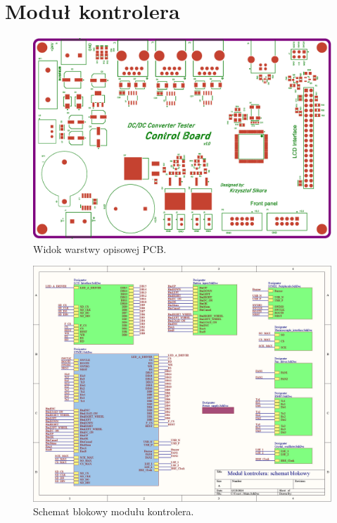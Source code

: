 \appendix

\chapter{Moduł kontrolera}
\begingroup
\renewcommand{\cleardoublepage}{}
\renewcommand{\clearpage}{}
\begin{figure}[h!]
    \begin{center}
        \includegraphics[width = 17cm]{zalaczniki/kontroler/Kontroler_Strona_15.jpg}
        \caption{Widok warstwy opisowej PCB.}
    \end{center}
\end{figure}

\begin{figure}
    \begin{center}
        \includegraphics[width = 21cm]{zalaczniki/kontroler/Kontroler_Strona_01.jpg}
        \caption{Schemat blokowy modułu kontrolera.}
    \end{center}
\end{figure}

